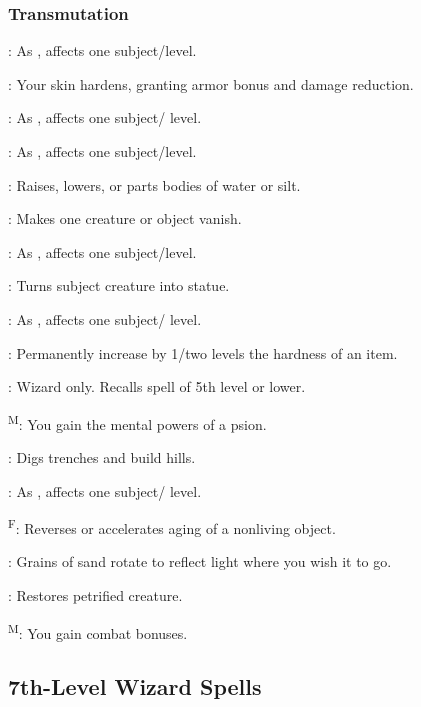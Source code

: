 \subsubsection{Transmutation}

	: As , affects one subject/level.

	: Your skin hardens, granting armor bonus and damage reduction. %

	: As , affects one subject/ level.

	: As , affects one subject/level.

	: Raises, lowers, or parts bodies of water or silt. %

	: Makes one creature or object vanish.

	: As , affects one subject/level.

	: Turns subject creature into statue.

	: As , affects one subject/ level.

	: Permanently increase by 1/two levels the hardness of an item.

	: Wizard only. Recalls spell of 5th level or lower.

	\textsuperscript{M}: You gain the mental powers of a psion.

	: Digs trenches and build hills.

	: As , affects one subject/ level.

	\textsuperscript{F}: Reverses or accelerates aging of a nonliving object. %

	: Grains of sand rotate to reflect light where you wish it to go. %

	: Restores petrified creature.

	\textsuperscript{M}: You gain combat bonuses.



\subsection{7th-Level Wizard Spells}

